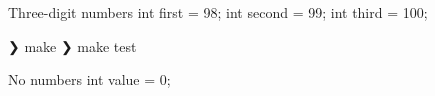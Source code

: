 \documentclass{article}
\newcommand{\expectedside}{left}
\begin{document}
\begin{cpp}[listingopts={firstnumber=98}]{Three-digit numbers}
int first = 98;
int second = 99;
int third = 100;
\end{cpp}
\def\expectedside{right}
\begin{terminal}[listingopts={numbers=right,firstnumber=998}]
❯ make
❯ make test
\end{terminal}
\def\expectedside{none}
\begin{cpp}[listingopts={numbers=none}]{No numbers}
int value = 0;
\end{cpp}
\end{document}

